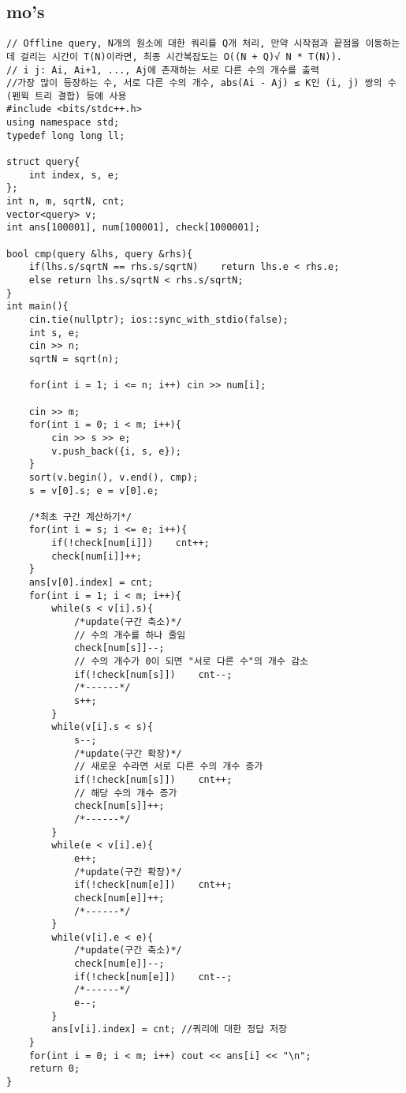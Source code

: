 \documentclass[landscape, 8pt, a4paper, oneside, twocolumn]{extarticle}
\begin{document}
    \subsection{mo's}
    \begin{verbatim}
// Offline query, N개의 원소에 대한 쿼리를 Q개 처리, 만약 시작점과 끝점을 이동하는데 걸리는 시간이 T(N)이라면, 최종 시간복잡도는 O((N + Q)√ N * T(N)).
// i j: Ai, Ai+1, ..., Aj에 존재하는 서로 다른 수의 개수를 출력
//가장 많이 등장하는 수, 서로 다른 수의 개수, abs(Ai - Aj) ≤ K인 (i, j) 쌍의 수(펜윅 트리 결합) 등에 사용
#include <bits/stdc++.h>
using namespace std;
typedef long long ll;

struct query{
    int index, s, e;
};
int n, m, sqrtN, cnt;
vector<query> v;
int ans[100001], num[100001], check[1000001];

bool cmp(query &lhs, query &rhs){
    if(lhs.s/sqrtN == rhs.s/sqrtN)    return lhs.e < rhs.e;
    else return lhs.s/sqrtN < rhs.s/sqrtN;
}
int main(){
    cin.tie(nullptr); ios::sync_with_stdio(false);
    int s, e;
    cin >> n;
    sqrtN = sqrt(n);

    for(int i = 1; i <= n; i++) cin >> num[i];

    cin >> m;
    for(int i = 0; i < m; i++){
        cin >> s >> e;
        v.push_back({i, s, e});
    }
    sort(v.begin(), v.end(), cmp);
    s = v[0].s; e = v[0].e;

    /*최초 구간 계산하기*/
    for(int i = s; i <= e; i++){
        if(!check[num[i]])    cnt++;
        check[num[i]]++;
    }
    ans[v[0].index] = cnt;
    for(int i = 1; i < m; i++){
        while(s < v[i].s){
            /*update(구간 축소)*/
            // 수의 개수를 하나 줄임
            check[num[s]]--;
            // 수의 개수가 0이 되면 "서로 다른 수"의 개수 감소
            if(!check[num[s]])    cnt--;
            /*------*/
            s++;
        }
        while(v[i].s < s){
            s--;
            /*update(구간 확장)*/
            // 새로운 수라면 서로 다른 수의 개수 증가
            if(!check[num[s]])    cnt++;
            // 해당 수의 개수 증가
            check[num[s]]++;
            /*------*/
        }
        while(e < v[i].e){
            e++;
            /*update(구간 확장)*/
            if(!check[num[e]])    cnt++;
            check[num[e]]++;
            /*------*/
        }
        while(v[i].e < e){
            /*update(구간 축소)*/
            check[num[e]]--;
            if(!check[num[e]])    cnt--;
            /*------*/
            e--;
        }
        ans[v[i].index] = cnt; //쿼리에 대한 정답 저장
    }
    for(int i = 0; i < m; i++) cout << ans[i] << "\n";
    return 0;
}
    \end{verbatim}
\end{document}
